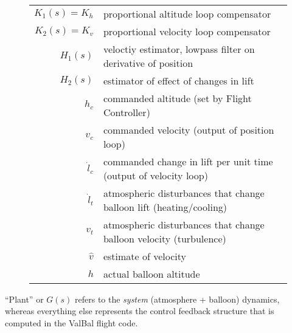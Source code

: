 \documentclass[11pt]{article}
\begin{document}
\begin{figure}[h!]
\begin{tikzpicture}
\end{tikzpicture}\\
\vspace{0.5cm}
\begin{tabular}{r l}
$K_1(s) = K_h$ & proportional altitude loop compensator \\
$K_2(s) = K_v$ & proportional velocity loop compensator \\ 
$H_1(s)$ & veloctiy estimator, lowpass filter on derivative of position\\
$H_2(s)$ & estimator of effect of changes in lift \vspace{.3cm}\\
$h_c$ & commanded altitude \footnotesize (set by Flight Controller) \\
$v_c$ & commanded velocity \footnotesize (output of position loop) \\
$\dot l_c$ & commanded change in lift per unit time  \footnotesize (output of velocity loop)\\
$\dot l_t$ & atmospheric disturbances that change balloon lift  \footnotesize (heating/cooling)\\
$v_t$ & atmospheric disturbances that change balloon velocity \footnotesize (turbulence)\\
$\hat v$ & estimate of velocity\\
$h$ & actual balloon altitude\\

\end{tabular}
\end{figure}

``Plant'' or $G(s)$ refers to the \emph{system} (atmosphere + balloon) dynamics, whereas everything else represents the control feedback structure that is computed in the ValBal flight code.


\newpage
\end{document}
